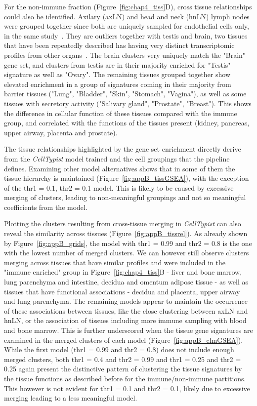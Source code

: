 For the non-immune fraction (Figure~\ref{fig:chap4_tiss}D), cross tissue relationships could also be identified. Axilary (axLN) and head and neck (hnLN) lymph nodes were grouped together since both are uniquely sampled for endothelial cells only, in the same study~\citep{takeda_single-cell_2019}. They are outliers together with testis and brain, two tissues that have been repeatedly described has having very distinct transcriptomic profiles from other organs~\cite{brawand_evolution_2011,barbosa-morais_evolutionary_2012}. The brain clusters very uniquely match the "Brain" gene set, and clusters from testis are in their majority enriched for "Testis" signature as well as "Ovary". The remaining tissues grouped together show elevated enrichment in a group of signatures coming in their majority from barrier tissues ("Lung", "Bladder", "Skin", "Stomach", "Vagina"), as well as some tissues with secretory activity ("Salivary gland", "Prostate", "Breast"). This shows the difference in cellular function of these tissues compared with the immune group, and correlated with the functions of the tissues present (kidney, pancreas, upper airway, placenta and prostate).

The tissue relationships highlighted by the gene set enrichment directly derive from the \textit{CellTypist} model trained and the cell groupings that the pipeline defines. Examining other model alternatives shows that in some of them the tissue hierarchy is maintained (Figure~\ref{fig:appB_tissGSEA}), with the exception of the thr1 = 0.1, thr2 = 0.1 model. This is likely to be caused by excessive merging of clusters, leading to non-meaningful groupings and not so meaningful coefficients from the model.

Plotting the clusters resulting from cross-tissue merging in \textit{CellTypist} can also reveal the similarity across tissues (Figure~\ref{fig:appB_tissrel}). As already shown by Figure~\ref{fig:appB_grids}, the model with thr1 = 0.99 and thr2 = 0.8 is the one with the lowest number of merged clusters. We can however still observe clusters merging across tissues that have similar profiles and were included in the "immune enriched" group in Figure~\ref{fig:chap4_tiss}B - liver and bone marrow, lung parenchyma and intestine, decidua and omentum adipose tissue - as well as tissues that have functional associations - decidua and placenta, upper airway and lung parenchyma. The remaining models appear to maintain the occurrence of these associations between tissues, like the close clustering between axLN and hnLN, or the association of tissues including more immune sampling with blood and bone marrow. This is further underscored when the tissue gene signatures are examined in the merged clusters of each model (Figure~\ref{fig:appB_clmGSEA}). While the first model (thr1 = 0.99 and thr2 = 0.8) does not include enough merged clusters, both thr1 = 0.4 and thr2 = 0.99 and thr1 = 0.25 and thr2 = 0.25 again present the distinctive pattern of clustering the tissue signatures by the tissue functions as described before for the immune/non-immune partitions. This however is not evident for thr1 = 0.1 and thr2 = 0.1, likely due to excessive merging leading to a less meaningful model.

